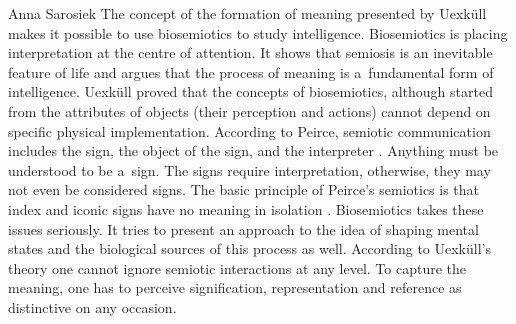 \begin{artengenv}{Anna Sarosiek}
The concept of the formation of meaning presented by Uexküll makes it possible to use biosemiotics to study intelligence. Biosemiotics is placing interpretation at the centre of attention. It shows that semiosis is an inevitable feature of life and argues that the process of meaning is a~fundamental form of intelligence. Uexküll proved that the concepts of biosemiotics, although started from the attributes of objects (their perception and actions) cannot depend on specific physical implementation. According to Peirce, semiotic communication includes the sign, the object of the sign, and the interpreter
\parencite[][]{peirce_essential_1998}. %
 Anything must be understood to be a~sign. The signs require interpretation, otherwise, they may not even be considered signs. The basic principle of Peirce’s semiotics is that index and iconic signs have no meaning in isolation 
\parencite[][]{peirce_essential_1998}. %
 Biosemiotics takes these issues seriously. It tries to present an approach to the idea of shaping mental states and the biological sources of this process as well. According to Uexküll's theory one cannot ignore semiotic interactions at any level. To capture the meaning, one has to perceive signification, representation and reference as distinctive on any occasion.


\end{artengenv}
